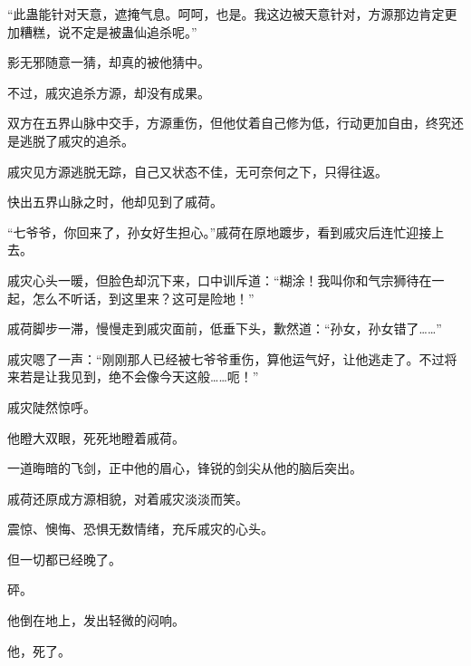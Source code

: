 \begin{this_body}
“此蛊能针对天意，遮掩气息。呵呵，也是。我这边被天意针对，方源那边肯定更加糟糕，说不定是被蛊仙追杀呢。”

影无邪随意一猜，却真的被他猜中。

不过，戚灾追杀方源，却没有成果。

双方在五界山脉中交手，方源重伤，但他仗着自己修为低，行动更加自由，终究还是逃脱了戚灾的追杀。

戚灾见方源逃脱无踪，自己又状态不佳，无可奈何之下，只得往返。

快出五界山脉之时，他却见到了戚荷。

“七爷爷，你回来了，孙女好生担心。”戚荷在原地踱步，看到戚灾后连忙迎接上去。

戚灾心头一暖，但脸色却沉下来，口中训斥道：“糊涂！我叫你和气宗狮待在一起，怎么不听话，到这里来？这可是险地！”

戚荷脚步一滞，慢慢走到戚灾面前，低垂下头，歉然道：“孙女，孙女错了……”

戚灾嗯了一声：“刚刚那人已经被七爷爷重伤，算他运气好，让他逃走了。不过将来若是让我见到，绝不会像今天这般……呃！”

戚灾陡然惊呼。

他瞪大双眼，死死地瞪着戚荷。

一道晦暗的飞剑，正中他的眉心，锋锐的剑尖从他的脑后突出。

戚荷还原成方源相貌，对着戚灾淡淡而笑。

震惊、懊悔、恐惧无数情绪，充斥戚灾的心头。

但一切都已经晚了。

砰。

他倒在地上，发出轻微的闷响。

他，死了。

\end{this_body}

